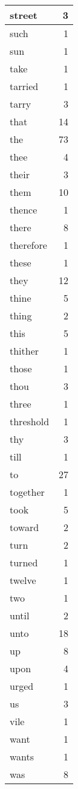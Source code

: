\begin{center}
\begin{longtable}{l|r}
street & 3 \\ \hline
such & 1 \\ \hline
sun & 1 \\ \hline
take & 1 \\ \hline
tarried & 1 \\ \hline
tarry & 3 \\ \hline
that & 14 \\ \hline
the & 73 \\ \hline
thee & 4 \\ \hline
their & 3 \\ \hline
them & 10 \\ \hline
thence & 1 \\ \hline
there & 8 \\ \hline
therefore & 1 \\ \hline
these & 1 \\ \hline
they & 12 \\ \hline
thine & 5 \\ \hline
thing & 2 \\ \hline
this & 5 \\ \hline
thither & 1 \\ \hline
those & 1 \\ \hline
thou & 3 \\ \hline
three & 1 \\ \hline
threshold & 1 \\ \hline
thy & 3 \\ \hline
till & 1 \\ \hline
to & 27 \\ \hline
together & 1 \\ \hline
took & 5 \\ \hline
toward & 2 \\ \hline
turn & 2 \\ \hline
turned & 1 \\ \hline
twelve & 1 \\ \hline
two & 1 \\ \hline
until & 2 \\ \hline
unto & 18 \\ \hline
up & 8 \\ \hline
upon & 4 \\ \hline
urged & 1 \\ \hline
us & 3 \\ \hline
vile & 1 \\ \hline
want & 1 \\ \hline
wants & 1 \\ \hline
was & 8 \\ \hline

\end{longtable}
\end{center}

